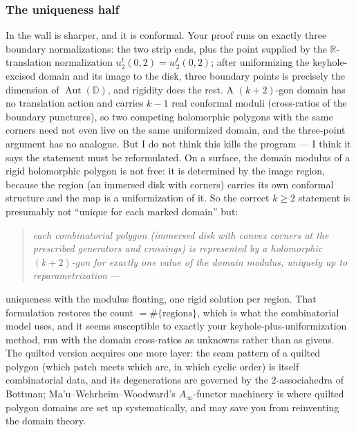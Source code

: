 \documentclass[11pt,reqno]{amsart}
\theoremstyle{plain}
\theoremstyle{definition}
\newcommand{\R}{\mathbb{R}}
\begin{document}
\subsubsection*{The uniqueness half}
In \cite{Z2} the wall is sharper, and it is conformal. Your proof runs on exactly three
boundary normalizations: the two strip ends, plus the point supplied by the
$\R$-translation normalization $u_2^t(0,2)=w_2^t(0,2)$; after uniformizing the
keyhole-excised domain and its image to the disk, three boundary points is precisely the
dimension of $\operatorname{Aut}(\mathbb D)$, and rigidity does the rest. A $(k{+}2)$-gon
domain has no translation action and carries $k-1$ real conformal moduli (cross-ratios of the
boundary punctures), so two competing holomorphic polygons with the same corners need not
even live on the same uniformized domain, and the three-point argument has no analogue. But I
do not think this kills the program --- I think it says the statement must be reformulated.
On a surface, the domain modulus of a rigid holomorphic polygon is not free: it is determined
by the image region, because the region (an immersed disk with corners) carries its own
conformal structure and the map is a uniformization of it. So the correct $k\ge2$ statement
is presumably not ``unique for each marked domain'' but:
\begin{quote}
\emph{each combinatorial polygon (immersed disk with convex corners at the prescribed
generators and crossings) is represented by a holomorphic $(k{+}2)$-gon for exactly one value
of the domain modulus, uniquely up to reparametrization} ---
\end{quote}
uniqueness with the modulus floating, one rigid solution per region. That formulation
restores the count $=\#\{\text{regions}\}$, which is what the combinatorial model uses, and
it seems susceptible to exactly your keyhole-plus-uniformization method, run with the domain
cross-ratios as unknowns rather than as givens. The quilted version acquires one more layer:
the seam pattern of a quilted polygon (which patch meets which arc, in which cyclic order) is
itself combinatorial data, and its degenerations are governed by the $2$-associahedra of
Bottman; Ma'u--Wehrheim--Woodward's $A_\infty$-functor machinery \cite{MWW} is where quilted
polygon domains are set up systematically, and may save you from reinventing the domain
theory.
\end{document}
